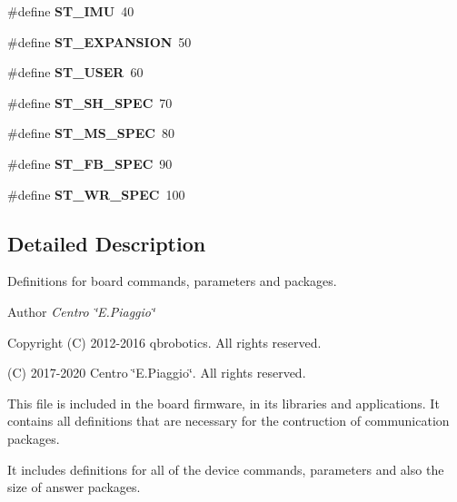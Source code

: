 \begin{DoxyCompactItemize}
\mbox{\label{definitions_8h_a6f71b4081fa44d0458fa27e891527315}} 
\#define {\bfseries S\+T\+\_\+\+I\+MU}~40
\item 
\mbox{\label{definitions_8h_a3aacefdd9f8dddbb7b55bcd39bf22792}} 
\#define {\bfseries S\+T\+\_\+\+E\+X\+P\+A\+N\+S\+I\+ON}~50
\item 
\mbox{\label{definitions_8h_a16d74d98ce4fcdfb20501e89e37ff053}} 
\#define {\bfseries S\+T\+\_\+\+U\+S\+ER}~60
\item 
\mbox{\label{definitions_8h_a788bae111bb48b9aa005ecf765ce1e94}} 
\#define {\bfseries S\+T\+\_\+\+S\+H\+\_\+\+S\+P\+EC}~70
\item 
\mbox{\label{definitions_8h_a09fa5a059f637c6e635e27cbb1b437f8}} 
\#define {\bfseries S\+T\+\_\+\+M\+S\+\_\+\+S\+P\+EC}~80
\item 
\mbox{\label{definitions_8h_aad8e3965151790073226b9ec124c0808}} 
\#define {\bfseries S\+T\+\_\+\+F\+B\+\_\+\+S\+P\+EC}~90
\item 
\mbox{\label{definitions_8h_a8d9602ba2be82a71e64ec82dc5ce72ba}} 
\#define {\bfseries S\+T\+\_\+\+W\+R\+\_\+\+S\+P\+EC}~100
\end{DoxyCompactItemize}


\subsection{Detailed Description}
Definitions for board commands, parameters and packages. 

\begin{DoxyAuthor}{Author}
{\itshape Centro \char`\"{}\+E.\+Piaggio\char`\"{}} 
\end{DoxyAuthor}
\begin{DoxyCopyright}{Copyright}
(C) 2012-\/2016 qbrobotics. All rights reserved. 

(C) 2017-\/2020 Centro \char`\"{}\+E.\+Piaggio\char`\"{}. All rights reserved.
\end{DoxyCopyright}
This file is included in the board firmware, in its libraries and applications. It contains all definitions that are necessary for the contruction of communication packages.

It includes definitions for all of the device commands, parameters and also the size of answer packages. 